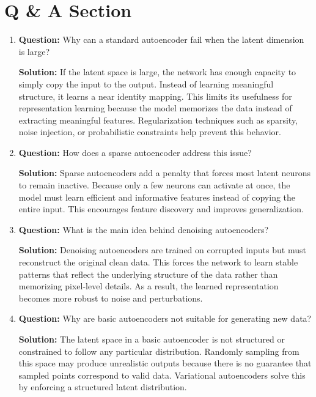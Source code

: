 \documentclass{article}
\begin{document}
\section{Q \& A Section}

\begin{enumerate}

\item \textbf{Question:} 
Why can a standard autoencoder fail when the latent dimension is large?

\textbf{Solution:}  
If the latent space is large, the network has enough capacity to simply copy the input to the output. Instead of learning meaningful structure, it learns a near identity mapping. This limits its usefulness for representation learning because the model memorizes the data instead of extracting meaningful features. Regularization techniques such as sparsity, noise injection, or probabilistic constraints help prevent this behavior.

\item \textbf{Question:} 
How does a sparse autoencoder address this issue?

\textbf{Solution:}  
Sparse autoencoders add a penalty that forces most latent neurons to remain inactive. Because only a few neurons can activate at once, the model must learn efficient and informative features instead of copying the entire input. This encourages feature discovery and improves generalization.

\item \textbf{Question:} 
What is the main idea behind denoising autoencoders?

\textbf{Solution:}  
Denoising autoencoders are trained on corrupted inputs but must reconstruct the original clean data. This forces the network to learn stable patterns that reflect the underlying structure of the data rather than memorizing pixel-level details. As a result, the learned representation becomes more robust to noise and perturbations.

\item \textbf{Question:} 
Why are basic autoencoders not suitable for generating new data?

\textbf{Solution:}  
The latent space in a basic autoencoder is not structured or constrained to follow any particular distribution. Randomly sampling from this space may produce unrealistic outputs because there is no guarantee that sampled points correspond to valid data. Variational autoencoders solve this by enforcing a structured latent distribution.


\end{enumerate}
\end{document}
